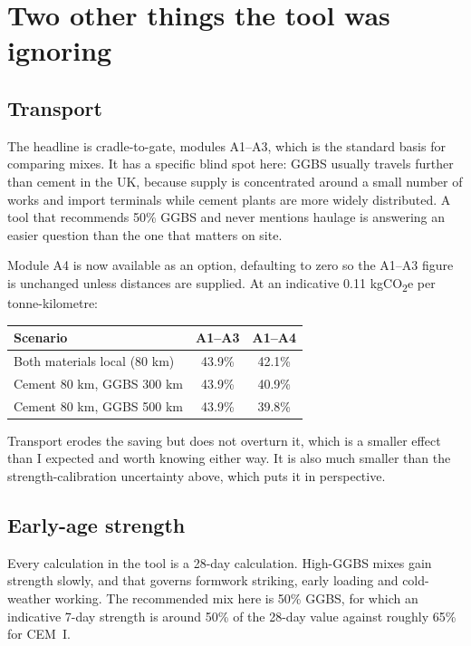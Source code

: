 \documentclass[11pt,a4paper]{article}
\begin{document}
\section{Two other things the tool was ignoring}

\subsection{Transport}

The headline is cradle-to-gate, modules A1--A3, which is the standard basis for comparing mixes.
It has a specific blind spot here: GGBS usually travels further than cement in the UK, because
supply is concentrated around a small number of works and import terminals while cement plants
are more widely distributed. A tool that recommends 50\% GGBS and never mentions haulage is
answering an easier question than the one that matters on site.

Module A4 is now available as an option, defaulting to zero so the A1--A3 figure is unchanged
unless distances are supplied. At an indicative 0.11 kgCO\textsubscript{2}e per tonne-kilometre:

\begin{center}
\begin{tabular}{lcc}
\toprule
\textbf{Scenario} & \textbf{A1--A3} & \textbf{A1--A4} \\
\midrule
Both materials local (80 km)            & 43.9\% & 42.1\% \\
Cement 80 km, GGBS 300 km               & 43.9\% & 40.9\% \\
Cement 80 km, GGBS 500 km               & 43.9\% & 39.8\% \\
\bottomrule
\end{tabular}
\end{center}

Transport erodes the saving but does not overturn it, which is a smaller effect than I expected
and worth knowing either way. It is also much smaller than the strength-calibration uncertainty
above, which puts it in perspective.

\subsection{Early-age strength}

Every calculation in the tool is a 28-day calculation. High-GGBS mixes gain strength slowly, and
that governs formwork striking, early loading and cold-weather working. The recommended mix here
is 50\% GGBS, for which an indicative 7-day strength is around 50\% of the 28-day value against
roughly 65\% for CEM~I.
\end{document}
